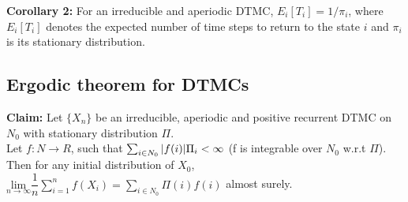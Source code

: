 \documentclass[a4paper,10pt]{article}
\theoremstyle{plain}
\theoremstyle{definition}
\theoremstyle{remark}
\begin{document}
\textbf{Corollary 2:} For an irreducible and aperiodic DTMC, $E_i[T_i] = 1/\pi_i$, where $E_i[T_i]$ denotes the expected number of time steps to return to the state $i$ and $\pi_i$ is its stationary distribution.\\

\subsection{Ergodic theorem for DTMCs}

\textbf{Claim:} Let $\{X_n\}$ be an irreducible, aperiodic and positive recurrent DTMC on $N_0$ with stationary distribution $\Pi$.\\
Let $f : N \longrightarrow R$, such that $\sum_{i \in N_0} \arrowvert f(i) \arrowvert \Pi_i < \infty$ (f is integrable over $N_0$ w.r.t $\Pi$).\\
Then for any initial distribution of $X_0$,\\
$\underset{n\rightarrow \infty}{\text{lim}} \dfrac{1}{n} \sum_{i=1}^{n} f(X_i) = \sum_{i \in N_0} \Pi(i)f(i)$ almost surely.\\
\end{document}
